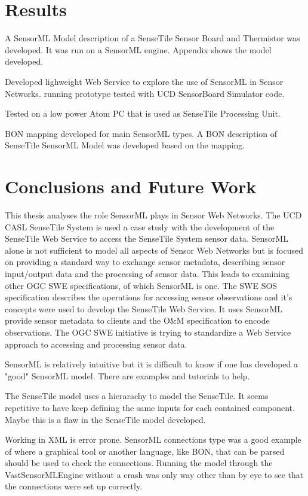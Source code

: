 \documentclass[]{final_report}
\begin{document}
\chapter{Results}

A  SensorML Model description of a SenseTile Sensor Board and Thermistor was developed. It was
run on a SensorML engine. Appendix shows the model developed.

Developed lighweight Web Service to explore the use of SensorML in Sensor Networks.
running prototype tested with UCD SensorBoard Simulator code.

Tested on a low power Atom PC that is used as SenseTile Processing Unit.

BON mapping developed for main SensorML types. A BON description of SenseTile SensorML Model
was developed based on the mapping.

\chapter{ Conclusions and Future Work}
This thesis analyses the role SensorML plays in Sensor Web Networks. The UCD CASL SenseTile System is used a case study with the development of the SenseTile Web Service to access the SenseTile System sensor data. SensorML alone is not sufficient to model all aspects of Sensor Web Networks but is focused on providing a standard way to exchange sensor metadata, describing sensor input/output data and the processing of sensor data. This leads to examining other OGC SWE specifications, of which SensorML is one. The SWE SOS specification describes the operations for accessing sensor observations and it's concepts were used to develop the SenseTile Web Service. It uses SensorML provide sensor metadata to clients and the O\&M specification to encode observations. The OGC SWE initiative is trying to standardize a Web Service approach to accessing and processing sensor data.

SensorML is relatively intuitive but it is difficult to know if one has developed a "good" SensorML model. There are examples and tutorials to help. 

The SenseTile model uses a hierarachy to model the SenseTile. It seems repetitive to have keep defining the same inputs for each contained component. Maybe this is a flaw in the SenseTile model developed.

Working in XML is error prone. SensorML connections type was a good example of where a graphical tool or another language, like BON,  that can be parsed should be used to check the connections. Running the model through the VastSensorMLEngine without a crash was only way other than by eye to see that the connections were set up correctly. 
\end{document}
